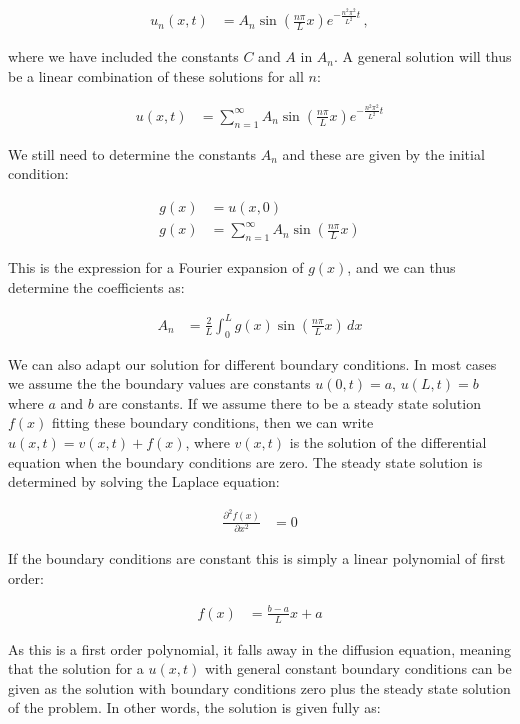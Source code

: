 \documentclass[reprint,english,notitlepage]{revtex4-1}  %
\begin{document}
\begin{align*}
u_n(x,t) &= A_n \sin (\frac{n\pi}{L} x ) e^{-\frac{n^2 \pi^2}{L^2} t} \, ,
\end{align*}

where we have included the constants $C$ and $A$ in $A_n$. A general solution will thus be a linear combination of these solutions for all $n$:

\begin{align*}
u(x,t) &= \sum\limits_{n=1}^\infty A_n \sin (\frac{n\pi}{L} x) e^{-\frac{n^2 \pi^2}{L^2} t} 
\end{align*}

We still need to determine the constants $A_n$ and these are given by the initial condition:

\begin{align*}
g(x) &= u(x,0) \\
g(x) &= \sum\limits_{n=1}^\infty A_n \sin ( \frac{n\pi}{L} x) 
\end{align*}

This is the expression for a Fourier expansion of $g(x)$, and we can thus determine the coefficients as:

\begin{align*}
A_n &= \frac{2}{L} \int_0^L g(x) \sin (\frac{n\pi}{L} x) \, dx
\end{align*}

We can also adapt our solution for different boundary conditions. In most cases we assume the the boundary values are constants $u(0,t) = a$, $u(L,t) = b$ where $a$ and $b$ are constants. If we assume there to be a steady state solution $f(x)$ fitting these boundary conditions, then we can write $u(x,t) = v(x,t) + f(x)$, where $v(x,t)$ is the solution of the differential equation when the boundary conditions are zero. The steady state solution is determined by solving the Laplace equation:

\begin{align*}
\frac{\partial^2 f(x)}{\partial x^2} &= 0 
\end{align*}

If the boundary conditions are constant this is simply a linear polynomial of first order:

\begin{align*}
f(x) &= \frac{b-a}{L} x + a
\end{align*}

As this is a first order polynomial, it falls away in the diffusion equation, meaning that the solution for a $u(x,t)$ with general constant boundary conditions can be given as the solution with boundary conditions zero plus the steady state solution of the problem. In other words, the solution is given fully as:
\end{document}
